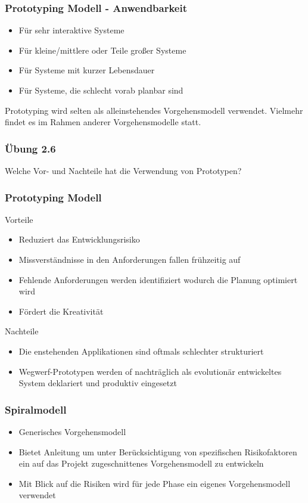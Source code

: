 \begin{frame}
\frametitle{Prototyping Modell - Anwendbarkeit}
	\begin{itemize}
		\item Für sehr interaktive Systeme
		\item Für kleine/mittlere oder Teile großer Systeme
		\item Für Systeme mit kurzer Lebensdauer
		\item Für Systeme, die schlecht vorab planbar sind
	\end{itemize}
	\bigskip
	Prototyping wird selten als alleinstehendes Vorgehensmodell verwendet.
	Vielmehr findet es im Rahmen anderer Vorgehensmodelle statt.
\end{frame}

\begin{frame}
\frametitle{Übung 2.6}
	Welche Vor- und Nachteile hat die Verwendung von Prototypen?
\end{frame}

\begin{frame}
\frametitle{Prototyping Modell}
	Vorteile
	\begin{itemize}
		\item Reduziert das Entwicklungsrisiko
		\item Missverständnisse in den Anforderungen fallen frühzeitig auf
		\item Fehlende Anforderungen werden identifiziert wodurch die Planung optimiert wird
		\item Fördert die Kreativität
	\end{itemize}
	\bigskip
	Nachteile
	\begin{itemize}
		\item Die enstehenden Applikationen sind oftmals schlechter strukturiert
		\item Wegwerf-Prototypen werden of nachträglich als evolutionär entwickeltes System deklariert
		und produktiv eingesetzt
	\end{itemize}
\end{frame}

\begin{frame}
\frametitle{Spiralmodell}
	\begin{itemize}
		\item Generisches Vorgehensmodell
		\item Bietet Anleitung um unter Berücksichtigung von spezifischen Risikofaktoren
		ein auf das Projekt zugeschnittenes Vorgehensmodell zu entwickeln
		\item Mit Blick auf die Risiken wird für jede Phase ein eigenes Vorgehensmodell
		verwendet
	\end{itemize}
\end{frame}

